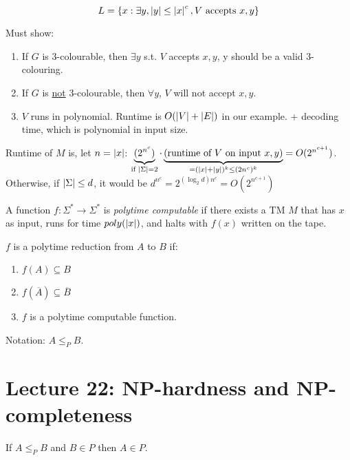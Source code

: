 \begin{equation*}
    L = \left \{ x : \exists y, |y| \leq \left | x \right |^c, V \text{ accepts } x, y \right \}
\end{equation*}

Must show:

\begin{enumerate}
    \item If $G$ is 3-colourable, then $\exists y$ s.t. $V$ accepts $x, y$, y should be a valid 3-colouring.
    \item If $G$ is \underline{not} 3-colourable, then $\forall y$, $V$ will not accept $x, y$.
    \item $V$ runs in polynomial. Runtime is $O(\left | V \right | + \left | E \right |)$ in our example. + decoding time, which is polynomial in input size.
\end{enumerate}

Runtime of $M$ is, let $n = \left | x \right |$: $\underbrace{(2^{n^c})}_{\text{if } \left | \Sigma \right | = 2} \cdot \underbrace{(\text{runtime of } V \text{ on input } x, y)}_{= (\left | x \right | + \left | y \right |)^k \leq (2n^c)^k} = O(2^{n^{c+1}})$. Otherwise, if $\left | \Sigma \right | \leq d$, it would be $d^{n^c} = 2^{(\log_2{d})n^c} = O(2^{n^{c+1}})$

\begin{definition}
    A function $f : \Sigma^* \rightarrow \Sigma^*$ is \emph{polytime computable} if there exists a TM $M$ that has $x$ as input, runs for time $poly(\left | x \right |)$, and halts with $f(x)$ written on the tape.
\end{definition}

\begin{definition}
    $f$ is a polytime reduction from $A$ to $B$ if:

    \begin{enumerate}
        \item $f(A) \subseteq B$
        \item $f(\overline{A}) \subseteq \overline{B}$
        \item $f$ is a polytime computable function.
    \end{enumerate}
\end{definition}

Notation: $A \leq_{P} B$.

\section*{Lecture 22: NP-hardness and NP-completeness}

\begin{theorem}
    If $A \leq_{P} B$ and $B \in P$ then $A \in P$.
\end{theorem}

